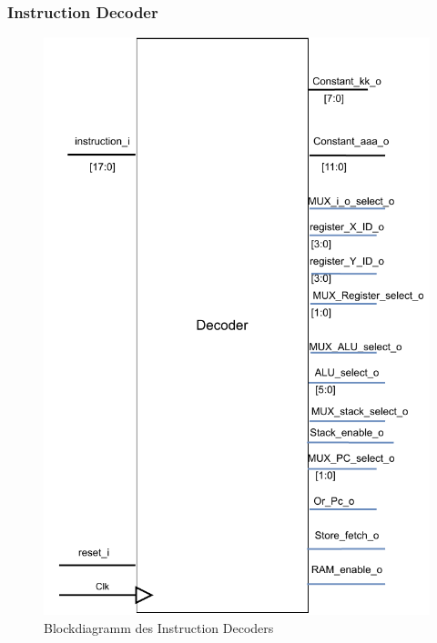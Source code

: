 \documentclass{scrartcl}
\begin{document}
\subsubsection{Instruction Decoder}
\begin{figure}[H]
    \centering
    \includegraphics[height=0.6\textheight]{ID_beschreibung.pdf}
    \caption{Blockdiagramm des Instruction Decoders}
    \label{fig:Block_InstructionDecoder}
\end{figure}
\end{document}
